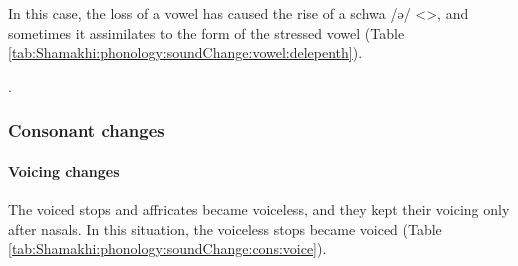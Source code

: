 In this case, the loss of a vowel has caused the rise of a schwa /ə/ <>, and sometimes it assimilates to the form of the stressed vowel (Table \ref{tab:Shamakhi:phonology:soundChange:vowel:delepenth}). 




\begin{table}[H]
	\centering
	\caption{Pre-tonic vowel deletion feeds vowel epenthesis and harmony in the Shamakhi dialect}
	\label{tab:Shamakhi:phonology:soundChange:vowel:delepenth}
\end{table}. 

\subsubsection{Consonant changes}

\paragraph{Voicing changes}
The voiced stops and affricates became voiceless, and they kept their voicing only after nasals. In this situation, the voiceless stops became voiced (Table \ref{tab:Shamakhi:phonology:soundChange:cons:voice}).



